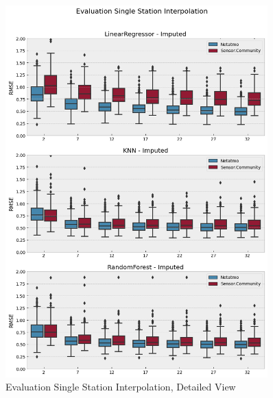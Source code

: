 \begin{figure}[ht]
    \centering
    \includegraphics[width=0.9\textwidth]{images/eval imputed vs not imputed.png}
    \caption{Evaluation Single Station Interpolation, Detailed View}
    \label{fig:eval single station interpolation detailed}
\end{figure}

